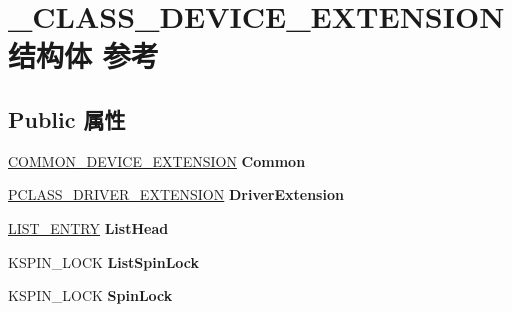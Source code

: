 \hypertarget{struct___c_l_a_s_s___d_e_v_i_c_e___e_x_t_e_n_s_i_o_n}{}\section{\+\_\+\+C\+L\+A\+S\+S\+\_\+\+D\+E\+V\+I\+C\+E\+\_\+\+E\+X\+T\+E\+N\+S\+I\+O\+N结构体 参考}
\label{struct___c_l_a_s_s___d_e_v_i_c_e___e_x_t_e_n_s_i_o_n}
\subsection*{Public 属性}
\begin{DoxyCompactItemize}
\item 
\mbox{\label{struct___c_l_a_s_s___d_e_v_i_c_e___e_x_t_e_n_s_i_o_n_a0916324afba05e8b8908f8869db3afa6}} 
\hyperlink{struct_c_o_m_m_o_n___d_e_v_i_c_e___e_x_t_e_n_s_i_o_n}{C\+O\+M\+M\+O\+N\+\_\+\+D\+E\+V\+I\+C\+E\+\_\+\+E\+X\+T\+E\+N\+S\+I\+ON} {\bfseries Common}
\item 
\mbox{\label{struct___c_l_a_s_s___d_e_v_i_c_e___e_x_t_e_n_s_i_o_n_aa1e02dfd2104d5b6237e604ee8a9ec74}} 
\hyperlink{struct___c_l_a_s_s___d_r_i_v_e_r___e_x_t_e_n_s_i_o_n}{P\+C\+L\+A\+S\+S\+\_\+\+D\+R\+I\+V\+E\+R\+\_\+\+E\+X\+T\+E\+N\+S\+I\+ON} {\bfseries Driver\+Extension}
\item 
\mbox{\label{struct___c_l_a_s_s___d_e_v_i_c_e___e_x_t_e_n_s_i_o_n_abc6ac6362c6c59b0f830da219b4ce0a9}} 
\hyperlink{struct___l_i_s_t___e_n_t_r_y}{L\+I\+S\+T\+\_\+\+E\+N\+T\+RY} {\bfseries List\+Head}
\item 
\mbox{\label{struct___c_l_a_s_s___d_e_v_i_c_e___e_x_t_e_n_s_i_o_n_a64ffa819eecb2940b6740bd55bd833fa}} 
K\+S\+P\+I\+N\+\_\+\+L\+O\+CK {\bfseries List\+Spin\+Lock}
\item 
\mbox{\label{struct___c_l_a_s_s___d_e_v_i_c_e___e_x_t_e_n_s_i_o_n_ad292d410c931dc814fa6f93f550f058a}} 
K\+S\+P\+I\+N\+\_\+\+L\+O\+CK {\bfseries Spin\+Lock}
\item 

\end{DoxyCompactItemize}
